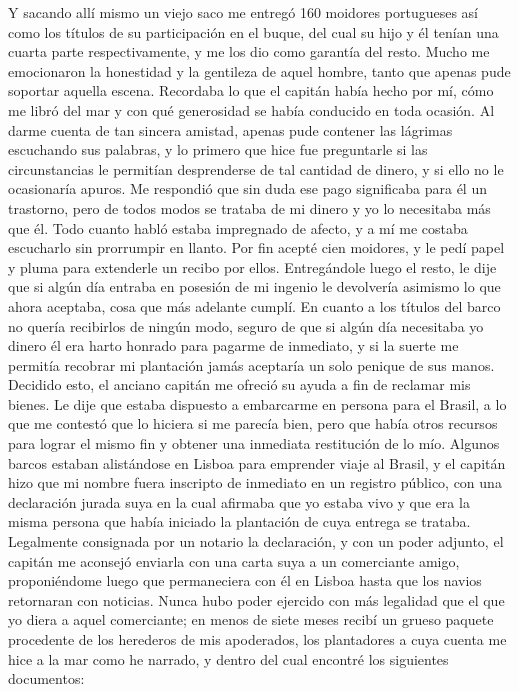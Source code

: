 \documentclass{novela}
\begin{document}
    Y sacando allí mismo un viejo saco me entregó 160 moidores portugueses así como los títulos de su participación en el buque, del cual su hijo y él tenían una cuarta parte respectivamente, y me los dio como garantía del resto.
    Mucho me emocionaron la honestidad y la gentileza de aquel hombre, tanto que apenas pude soportar aquella escena. Recordaba lo que el capitán había hecho por mí, cómo me libró del mar y con qué generosidad se había conducido en toda ocasión. Al darme cuenta de tan sincera amistad, apenas pude contener las lágrimas escuchando sus palabras, y lo primero que hice fue preguntarle si las circunstancias le permitían desprenderse de tal cantidad de dinero, y si ello no le ocasionaría apuros. Me respondió que sin duda ese pago significaba para él un trastorno, pero de todos modos se trataba de mi dinero y yo lo necesitaba más que él.
    Todo cuanto habló estaba impregnado de afecto, y a mí me costaba escucharlo sin prorrumpir en llanto. Por fin acepté cien moidores, y le pedí papel y pluma para extenderle un recibo por ellos. Entregándole luego el resto, le dije que si algún día entraba en posesión de mi ingenio le devolvería asimismo lo que ahora aceptaba, cosa que más adelante cumplí. En cuanto a los títulos del barco no quería recibirlos de ningún modo, seguro de que si algún día necesitaba yo dinero él era harto honrado para pagarme de inmediato, y si la suerte me permitía recobrar mi plantación jamás aceptaría un solo penique de sus manos.
    Decidido esto, el anciano capitán me ofreció su ayuda a fin de reclamar mis bienes. Le dije que estaba dispuesto a embarcarme en persona para el Brasil, a lo que me contestó que lo hiciera si me parecía bien, pero que había otros recursos para lograr el mismo fin y obtener una inmediata restitución de lo mío.
    Algunos barcos estaban alistándose en Lisboa para emprender viaje al Brasil, y el capitán hizo que mi nombre fuera inscripto de inmediato en un registro público, con una declaración jurada suya en la cual afirmaba que yo estaba vivo y que era la misma persona que había iniciado la plantación de cuya entrega se trataba.
    Legalmente consignada por un notario la declaración, y con un poder adjunto, el capitán me aconsejó enviarla con una carta suya a un comerciante amigo, proponiéndome luego que permaneciera con él en Lisboa hasta que los navios retornaran con noticias.
    Nunca hubo poder ejercido con más legalidad que el que yo diera a aquel comerciante; en menos de siete meses recibí un grueso paquete procedente de los herederos de mis apoderados, los plantadores a cuya cuenta me hice a la mar como he narrado, y dentro del cual encontré los siguientes documentos:
\end{document}
